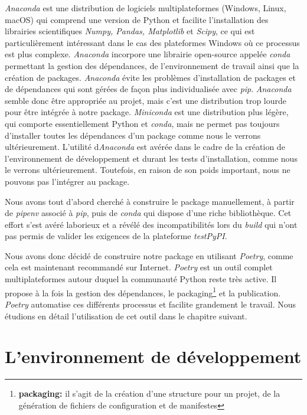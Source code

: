 \documentclass[twoside,a4paper,11pt,frenchb,openany]{report}
\begin{document}
\textit{Anaconda} est une distribution de logiciels multiplateformes (Windows, Linux, macOS) qui comprend une version de Python et facilite l'installation des librairies scientifiques \textit{Numpy, Pandas, Matplotlib} et \textit{Scipy}, ce qui est particulièrement intéressant dans le cas des plateformes Windows où ce processus est plus complexe. \textit{Anaconda} incorpore une librairie open-source appelée \textit{conda} permettant la gestion des dépendances, de l'environnement de travail ainsi que la création de packages. \textit{Anaconda} évite les problèmes d'installation de packages et de dépendances qui sont gérées de façon plus individualisée avec \textit{pip}. \textit{Anaconda} semble donc être appropriée au projet, mais c'est une distribution trop lourde pour être intégrée à notre package. \textit{Miniconda} est une distribution plus légère, qui comporte essentiellement Python et \textit{conda}, mais ne permet pas toujours d'installer toutes les dépendances d'un package comme nous le verrons ultérieurement. L'utilité d\textit{Anaconda} est avérée dans le cadre de la création de l'environnement de développement et durant les tests d'installation, comme nous le verrons ultérieurement. Toutefois, en raison de son poids important, nous ne pouvons pas l'intégrer au package.

Nous avons tout d'abord cherché à construire le package manuellement, à partir de \textit{pipenv} associé à \textit{pip}, puis de \textit{conda} qui dispose d'une riche bibliothèque. Cet effort s'est avéré laborieux et a révélé des incompatibilités lors du \textit{build} qui n'ont pas permis de valider les exigences de la plateforme \textit{testPyPI}.

Nous avons donc décidé de construire notre package en utilisant \textit{Poetry}, comme cela est maintenant recommandé sur Internet. \textit{Poetry} est un outil complet multiplateformes autour duquel la communauté Python reste très active. Il propose à la fois la gestion des dépendances, le packaging\footnote{\textbf{packaging:} il s'agit de la création d'une structure pour un projet, de la génération de fichiers de configuration et de manifestes} et la publication. \textit{Poetry} automatise ces différents processus et facilite grandement le travail. Nous étudions en détail l'utilisation de cet outil dans le chapitre suivant.





\section{L'environnement de développement}
\end{document}
